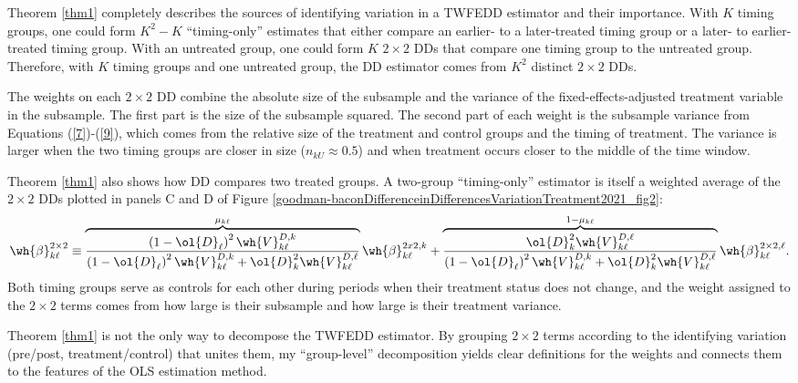 \documentclass[12pt]{article}
\theoremstyle{definition}
\begin{document}
Theorem \ref{thm1} completely describes the sources of identifying variation in a TWFEDD estimator and their importance. With $K$ timing groups, one could form $K^2 - K$ ``timing-only'' estimates that either compare an earlier- to a later-treated timing group or a later- to earlier-treated timing group. With an untreated group, one could form $K$ $2\times2$ DDs that compare one timing group to the untreated group. Therefore, with $K$ timing groups and one untreated group, the DD estimator comes from $K^2$ distinct $2\times2$ DDs.

The weights on each $2\times2$ DD combine the absolute size of the subsample and the variance of the fixed-effects-adjusted treatment variable in the subsample. The first part is the size of the subsample squared. The second part of each weight is the subsample variance from Equations (\ref{7})-(\ref{9}), which comes from the relative size of the treatment and control groups and the timing of treatment. The variance is larger when the two timing groups are closer in size ($n_{kU} \approx 0.5$) and when treatment occurs closer to the middle of the time window.

\setcounter{equation}{10}

Theorem \ref{thm1} also shows how DD compares two treated groups. A two-group ``timing-only'' estimator is itself a weighted average of the $2\times2$ DDs plotted in panels C and D of Figure \ref{goodman-baconDifferenceinDifferencesVariationTreatment2021_fig2}:
\begin{equation}
    \label{11}
    \wh{\beta}_{k \ell}^{2 \times 2} \equiv \overbrace{\frac{\left(1-\ol{D}_{\ell}\right)^2 \wh{V}_{k \ell}^{D, k}}{\left(1-\ol{D}_{\ell}\right)^2 \wh{V}_{k \ell}^{D, k}+\ol{D}_k^2 \wh{V}_{k \ell}^{D, \ell}}}^{\mu_{k \ell}} \wh{\beta}_{k \ell}^{2 x 2, k}+\overbrace{\frac{\ol{D}_k^2 \wh{V}_{k \ell}^{D, \ell}}{\left(1-\ol{D}_{\ell}\right)^2 \wh{V}_{k \ell}^{D, k}+\ol{D}_k^2 \wh{V}_{k \ell}^{D, \ell}}}^{1-\mu_{k \ell}} \wh{\beta}_{k \ell}^{2 \times 2, \ell} .
\end{equation}
Both timing groups serve as controls for each other during periods when their treatment status does not change, and the weight assigned to the $2\times2$ terms comes from how large is their subsample and how large is their treatment variance. 

Theorem \ref{thm1} is not the only way to decompose the TWFEDD estimator. By grouping $2\times2$ terms according to the identifying variation (pre/post, treatment/control) that unites them, my ``group-level'' decomposition yields clear definitions for the weights and connects them to the features of the OLS estimation method.
\end{document}
